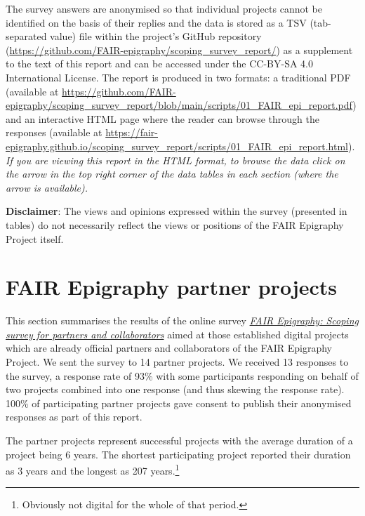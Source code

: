 \documentclass[
  12pt,
]{scrreprt}
\begin{document}
The survey answers are anonymised so that individual projects cannot be
identified on the basis of their replies and the data is stored as a TSV
(tab-separated value) file within the project's GitHub repository
(\url{https://github.com/FAIR-epigraphy/scoping_survey_report/}) as a
supplement to the text of this report and can be accessed under the
CC-BY-SA 4.0 International License. The report is produced in two
formats: a traditional PDF (available at
\url{https://github.com/FAIR-epigraphy/scoping_survey_report/blob/main/scripts/01_FAIR_epi_report.pdf})
and an interactive HTML page where the reader can browse through the
responses (available at
\url{https://fair-epigraphy.github.io/scoping_survey_report/scripts/01_FAIR_epi_report.html}).
\emph{If you are viewing this report in the HTML format, to browse the
data click on the arrow in the top right corner of the data tables in
each section (where the arrow is available).}

\textbf{Disclaimer}: The views and opinions expressed within the survey
(presented in tables) do not necessarily reflect the views or positions
of the FAIR Epigraphy Project itself.

\hypertarget{fair-epigraphy-partner-projects}{%
\chapter{FAIR Epigraphy partner
projects}\label{fair-epigraphy-partner-projects}}

\footnotesize

\normalsize

This section summarises the results of the online survey
\href{https://github.com/FAIR-epigraphy/scoping_survey_report/data/01_Survey_partners_questions.pdf}{\emph{FAIR
Epigraphy: Scoping survey for partners and collaborators}} aimed at
those established digital projects which are already official partners
and collaborators of the FAIR Epigraphy Project. We sent the survey to
14 partner projects. We received 13 responses to the survey, a response
rate of 93\% with some participants responding on behalf of two projects
combined into one response (and thus skewing the response rate). 100\%
of participating partner projects gave consent to publish their
anonymised responses as part of this report.

The partner projects represent successful projects with the average
duration of a project being 6 years. The shortest participating project
reported their duration as 3 years and the longest as 207
years.\footnote{Obviously not digital for the whole of that period.}
\end{document}
